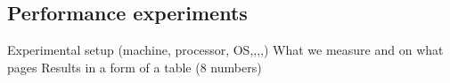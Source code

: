 \documentclass{llncs}
\begin{document}






\subsection{Performance experiments}
Experimental setup (machine, processor, OS,,,,)
What we measure and on what pages
Results in a form of a table (8 numbers)
\end{document}
